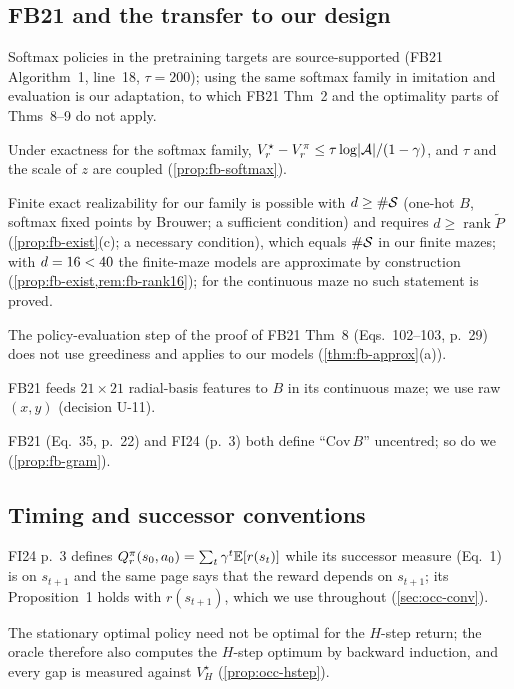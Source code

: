 \subsection{FB21 and the transfer to our design}

\begin{description}[style=nextline,leftmargin=1.2cm,font=\normalfont\sffamily]
\item[T1] Softmax policies in the pretraining targets are source-supported (FB21 Algorithm~1, line~18, $\tau=200$); using the same softmax family in imitation and evaluation is our adaptation, to which FB21 Thm~2 and the optimality parts of Thms~8--9 do not apply.
\item[T2] Under exactness for the softmax family, $V^\star_r-V^\pi_r\le\tau\log\lvert\cA\rvert/(1-\gamma)$, and $\tau$ and the scale of $z$ are coupled (\cref{prop:fb-softmax}).
\item[T3] Finite exact realizability for our family is possible with $d\ge\#\cS$ (one-hot $B$, softmax fixed points by Brouwer; a sufficient condition) and requires $d\ge\operatorname{rank}\tilde P$ (\cref{prop:fb-exist}(c); a necessary condition), which equals $\#\cS$ in our finite mazes; with $d=16<\vn{env.rank.4r}{40}$ the finite-maze models are approximate by construction (\cref{prop:fb-exist,rem:fb-rank16}); for the continuous maze no such statement is proved.
\item[T4] The policy-evaluation step of the proof of FB21 Thm~8 (Eqs.~102--103, p.~29) does not use greediness and applies to our models (\cref{thm:fb-approx}(a)).
\item[T5] FB21 feeds $21\times21$ radial-basis features to $B$ in its continuous maze; we use raw $(x,y)$ (decision U-11).
\item[T6] FB21 (Eq.~35, p.~22) and FI24 (p.~3) both define ``$\mathrm{Cov}\,B$'' uncentred; so do we (\cref{prop:fb-gram}).
\end{description}

\subsection{Timing and successor conventions}

\begin{description}[style=nextline,leftmargin=1.2cm,font=\normalfont\sffamily]
\item[R1] FI24 p.~3 defines $Q^\pi_r(s_0,a_0)=\sum_t\gamma^t\E[r(s_t)]$ while its successor measure (Eq.~1) is on $s_{t+1}$ and the same page says that the reward depends on $s_{t+1}$; its Proposition~1 holds with $r(s_{t+1})$, which we use throughout (\cref{sec:occ-conv}).
\item[R2] The stationary optimal policy need not be optimal for the $H$-step return; the oracle therefore also computes the $H$-step optimum by backward induction, and every gap is measured against $V^\star_H$ (\cref{prop:occ-hstep}).
\end{description}

